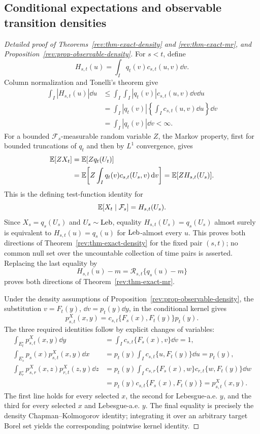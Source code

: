\subsection{Conditional expectations and observable transition densities}
\label{rev:app-conditional-kernel-proof}

\begin{proof}[Detailed proof of Theorems~\ref{rev:thm-exact-density} and
\ref{rev:thm-exact-mr}, and Proposition~\ref{rev:prop-observable-density}]
For $s<t$, define
\[
H_{s,t}(u)=\int_Iq_t(v)c_{s,t}(u,v)\dd v.
\]
Column normalization and Tonelli's theorem give
\begin{align*}
\int_I|H_{s,t}(u)|\dd u
&\le\int_I\int_I|q_t(v)|c_{s,t}(u,v)\dd v\dd u\\
&=\int_I|q_t(v)|
   \left\{\int_Ic_{s,t}(u,v)\dd u\right\}\dd v\\
&=\int_I|q_t(v)|\dd v<\infty.
\end{align*}
For a bounded $\mathcal F_s$-measurable random variable $Z$, the Markov
property, first for bounded truncations of $q_t$ and then by $L^1$ convergence,
gives
\begin{align*}
\mathbb E[ZX_t]
&=\mathbb E[Zq_t(U_t)]\\
&=\mathbb E\!\left[Z\int_Iq_t(v)c_{s,t}(U_s,v)\,\mathrm d v\right]
=\mathbb E[ZH_{s,t}(U_s)].
\end{align*}
This is the defining test-function identity for
\[
\mathbb E[X_t\mid\mathcal F_s]=H_{s,t}(U_s).
\]
Since $X_s=q_s(U_s)$ and $U_s\sim\operatorname{Leb}$, equality
$H_{s,t}(U_s)=q_s(U_s)$ almost surely is equivalent to
$H_{s,t}(u)=q_s(u)$ for $\operatorname{Leb}$-almost every $u$.  This proves both directions
of Theorem~\ref{rev:thm-exact-density} for the fixed pair $(s,t)$; no common
null set over the uncountable collection of time pairs is asserted.  Replacing
the last equality by
\[
H_{s,t}(u)-m=\mathcal R_{s,t}\{q_s(u)-m\}
\]
proves both directions of Theorem~\ref{rev:thm-exact-mr}.

Under the density assumptions of
Proposition~\ref{rev:prop-observable-density}, the substitution
$v=F_t(y)$, $\dd v=p_t(y)\dd y$, in the conditional kernel gives
\[
p^X_{s,t}(x,y)
=c_{s,t}\{F_s(x),F_t(y)\}p_t(y).
\]
The three required identities follow by explicit changes of variables:
\begin{align*}
\int_{E_t^\circ}p^X_{s,t}(x,y)\dd y
&=\int_Ic_{s,t}\{F_s(x),v\}\dd v=1,\\
\int_{E_s^\circ}p_s(x)p^X_{s,t}(x,y)\dd x
&=p_t(y)\int_Ic_{s,t}\{u,F_t(y)\}\dd u=p_t(y),\\
\int_{E_r^\circ}p^X_{s,r}(x,z)p^X_{r,t}(z,y)\dd z
&=p_t(y)\int_Ic_{s,r}\{F_s(x),w\}
                   c_{r,t}\{w,F_t(y)\}\dd w\\
&=p_t(y)c_{s,t}\{F_s(x),F_t(y)\}
=p^X_{s,t}(x,y).
\end{align*}
The first line holds for every selected $x$, the second for Lebesgue-a.e. $y$,
and the third for every selected $x$ and Lebesgue-a.e. $y$.  The final equality
is precisely the density Chapman--Kolmogorov identity; integrating it over an
arbitrary target Borel set yields the corresponding pointwise kernel identity.
\end{proof}

